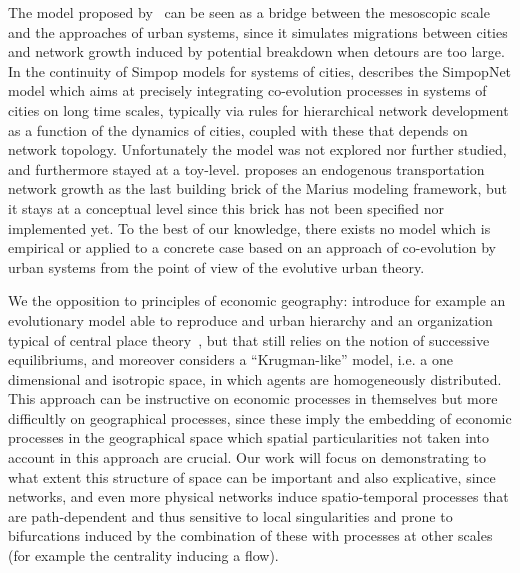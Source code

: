 The model proposed by~\cite{blumenfeld2010network} can be seen as a bridge between the mesoscopic scale and the approaches of urban systems, since it simulates migrations between cities and network growth induced by potential breakdown when detours are too large. In the continuity of Simpop models for systems of cities, \cite{schmitt2014modelisation} describes the SimpopNet model which aims at precisely integrating co-evolution processes in systems of cities on long time scales, typically via rules for hierarchical network development as a function of the dynamics of cities, coupled with these that depends on network topology. Unfortunately the model was not explored nor further studied, and furthermore stayed at a toy-level. \cite{cottineau2014evolution} proposes an endogenous transportation network growth as the last building brick of the Marius modeling framework, but it stays at a conceptual level since this brick has not been specified nor implemented yet. To the best of our knowledge, there exists no model which is empirical or applied to a concrete case based on an approach of co-evolution by urban systems from the point of view of the evolutive urban theory.

We  the  opposition  to  principles of economic geography: \cite{fujita1999evolution} introduce for example an evolutionary model able to reproduce and urban hierarchy and an organization typical of central place theory~\citep{banos2011christaller}, but that still relies on the notion of successive equilibriums, and moreover considers a ``Krugman-like'' model, i.e. a one dimensional and isotropic space, in which agents are homogeneously distributed. This approach can be instructive on economic processes in themselves but more difficultly on geographical processes, since these imply the embedding of economic processes in the geographical space which spatial particularities not taken into account in this approach are crucial. Our work will focus on demonstrating to what extent this structure of space can be important and also explicative, since networks, and even more physical networks induce spatio-temporal processes that are path-dependent and thus sensitive to local singularities and prone to bifurcations induced by the combination of these with processes at other scales (for example the centrality inducing a flow).


